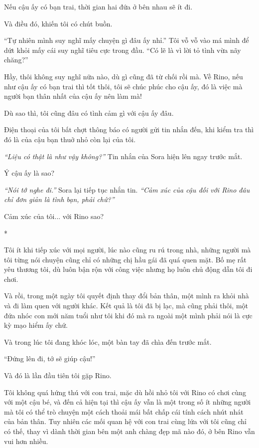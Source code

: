 {    Nếu cậu ấy có bạn trai, thời gian hai đứa ở bên nhau sẽ ít đi.

    Và điều đó, khiến tôi có chút buồn.

    ``Tự nhiên mình suy nghĩ mấy chuyện gì đâu ấy nhỉ.'' Tôi vỗ vỗ vào má
    mình để dứt khỏi mấy cái suy nghĩ tiêu cực trong đầu. ``Có lẽ là vì lời
    tỏ tình vừa nãy chăng?''

    Hầy, thôi không suy nghĩ nữa nào, dù gì cũng đã từ chối rồi mà. Về Rino,
    nếu như cậu ấy có bạn trai thì tốt thôi, tôi sẽ chúc phúc cho cậu ấy, đó
    là việc mà người bạn thân nhất của cậu ấy nên làm mà!

    Dù sao thì, tôi cũng đâu có tình cảm gì với cậu ấy đâu.

    Điện thoại của tôi bất chợt thông báo có người gửi tin nhắn đến, khi
    kiểm tra thì đó là của cậu bạn thuở nhỏ còn lại của tôi.

    \emph{``Liệu có thật là như vậy không?''} Tin nhắn của Sora hiện lên
    ngay trước mắt.

    Ý cậu ấy là sao?

    \emph{``Nói tớ nghe đi.''} Sora lại tiếp tục nhắn tin. \emph{``Cảm xúc
        của cậu đối với Rino đâu chỉ đơn giản là tình bạn, phải chứ?''}

    Cảm xúc của tôi... với Rino sao?

    *

    Tôi ít khi tiếp xúc với mọi người, lúc nào cũng ru rú trong nhà, những
    người mà tôi từng nói chuyện cũng chỉ có những chị hầu gái đã quá quen
    mặt. Bố mẹ rất yêu thương tôi, dù luôn bận rộn với công việc nhưng họ
    luôn chủ động dẫn tôi đi chơi.

    Và rồi, trong một ngày tôi quyết định thay đổi bản thân, một mình ra
    khỏi nhà và đi làm quen với người khác. Kết quả là tôi đã bị lạc, mà
    cũng phải thôi, một đứa nhóc con mới năm tuổi như tôi khi đó mà ra ngoài
    một mình phải nói là cực kỳ mạo hiểm ấy chứ.

    Và trong lúc tôi đang khóc lóc, một bàn tay đã chìa đến trước mắt.

    ``Đứng lên đi, tớ sẽ giúp cậu!''

    Và đó là lần đầu tiên tôi gặp Rino.

    Tôi không quá hứng thú với con trai, mặc dù hồi nhỏ tôi với Rino có chơi
    cùng với một cậu bé, và đến cả hiện tại thì cậu ấy vẫn là một trong số
    ít những người mà tôi có thể trò chuyện một cách thoải mái bất chấp cái
    tính cách nhút nhát của bản thân. Tuy nhiên các mối quan hệ với con trai
    cùng lứa với tôi cũng chỉ có thế, thay vì dành thời gian bên một anh
    chàng đẹp mã nào đó, ở bên Rino vẫn vui hơn nhiều.

}
